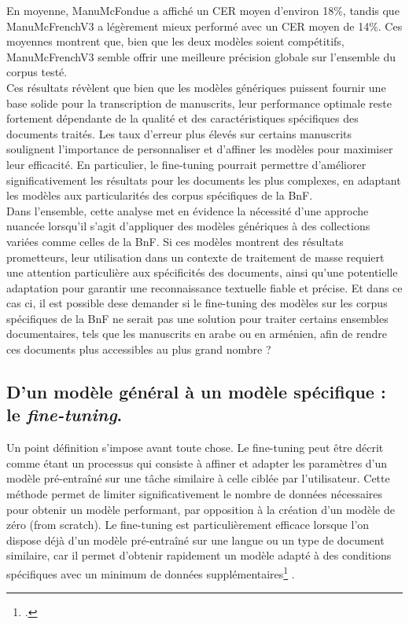 \documentclass[a4paper,12pt,twoside]{book}
\begin{document}
	En moyenne, ManuMcFondue a affiché un CER moyen d’environ 18\%, tandis que ManuMcFrenchV3 a légèrement mieux performé avec un CER moyen de 14\%. Ces moyennes montrent que, bien que les deux modèles soient compétitifs, ManuMcFrenchV3 semble offrir une meilleure précision globale sur l’ensemble du corpus testé.
	\\
	
	Ces résultats révèlent que bien que les modèles génériques puissent fournir une base solide pour la transcription de manuscrits, leur performance optimale reste fortement dépendante de la qualité et des caractéristiques spécifiques des documents traités. Les taux d’erreur plus élevés sur certains manuscrits soulignent l’importance de personnaliser et d’affiner les modèles pour maximiser leur efficacité. En particulier, le fine-tuning pourrait permettre d’améliorer significativement les résultats pour les documents les plus complexes, en adaptant les modèles aux particularités des corpus spécifiques de la BnF.
	\\
	
	Dans l’ensemble, cette analyse met en évidence la nécessité d’une approche nuancée lorsqu’il s’agit d’appliquer des modèles génériques à des collections variées comme celles de la BnF. Si ces modèles montrent des résultats prometteurs, leur utilisation dans un contexte de traitement de masse requiert une attention particulière aux spécificités des documents, ainsi qu’une potentielle adaptation pour garantir une reconnaissance textuelle fiable et précise. Et dans ce cas ci, il est possible dese demander si le fine-tuning des modèles sur les corpus spécifiques de la BnF ne serait pas une solution pour traiter certains ensembles documentaires, tels que les manuscrits en arabe ou en arménien, afin de rendre ces documents plus accessibles au plus grand nombre ? 
	
	\subsection{D'un modèle général à un modèle spécifique : le \textit{fine-tuning}.}
	
	Un point définition s’impose avant toute chose. Le fine-tuning peut être décrit comme étant un processus qui consiste à affiner et adapter les paramètres d’un modèle pré-entraîné sur une tâche similaire à celle ciblée par l’utilisateur. Cette méthode permet de limiter significativement le nombre de données nécessaires pour obtenir un modèle performant, par opposition à la création d’un modèle de zéro (from scratch). Le fine-tuning est particulièrement efficace lorsque l’on dispose déjà d’un modèle pré-entraîné sur une langue ou un type de document similaire, car il permet d’obtenir rapidement un modèle adapté à des conditions spécifiques avec un minimum de données supplémentaires\footcite{vidal-gorene_reconnaissance_2023} . 
	\\
	
\end{document}
